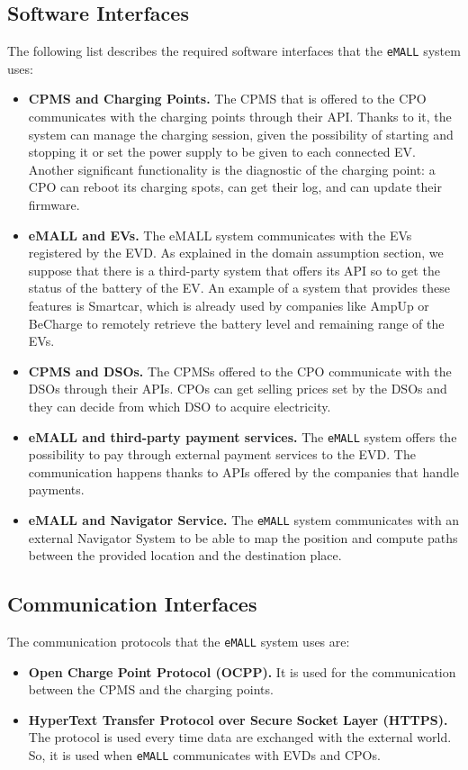\subsection{Software Interfaces}
\label{subsec:software_interfaces}%
The following list describes the required software interfaces that the \verb|eMALL| system uses:
\begin{itemize}
    \item \textbf{CPMS and Charging Points.} The CPMS that is offered to the CPO communicates with the charging points
    through their API\@.
    Thanks to it, the system can manage the charging session, given the possibility of starting and stopping it or set
    the power supply to be given to each connected EV\@.
    Another significant functionality is the diagnostic of the charging point:
    a CPO can reboot its charging spots, can get their log, and can update their firmware.
    \item \textbf{eMALL and EVs.} The eMALL system communicates with the EVs registered by the EVD\@.
    As explained in the domain assumption section, we suppose that there is a third-party system that offers its API
    so to get the status of the battery of the EV\@.
    An example of a system that provides these features is Smartcar,
    which is already used by companies like AmpUp or BeCharge to remotely retrieve the battery level and remaining range of the EVs.
    \item \textbf{CPMS and DSOs.} The CPMSs offered to the CPO communicate with the DSOs through their APIs.
    CPOs can get selling prices set by the DSOs and they can decide from which DSO to acquire electricity.
    \item \textbf{eMALL and third-party payment services.} The \verb|eMALL| system offers the possibility to pay through
    external payment services to the EVD\@.
    The communication happens thanks to APIs offered by the companies that handle payments.
    \item \textbf{eMALL and Navigator Service.} The \verb|eMALL| system communicates with an external Navigator System to be able to map the position and compute paths between the provided location and the destination place.
\end{itemize}

\subsection{Communication Interfaces}
\label{subsec:communication_interfaces}%
The communication protocols that the \verb|eMALL| system uses are:
\begin{itemize}
    \item \textbf{Open Charge Point Protocol (OCPP).} It is used for the communication between the CPMS and the charging
    points.
    \item \textbf{HyperText Transfer Protocol over Secure Socket Layer (HTTPS).} The protocol is used every time data are
    exchanged with the external world.
    So, it is used when \verb|eMALL| communicates with EVDs and CPOs.
\end{itemize}


